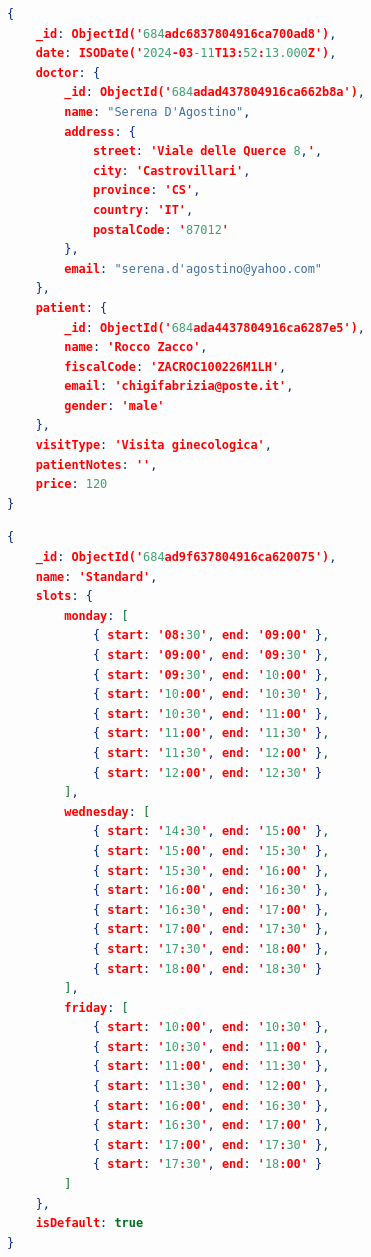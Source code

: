 \vspace{1em}

\begin{lstlisting}[language=json, caption={Example of an Appointment Document}]
{
    _id: ObjectId('684adc6837804916ca700ad8'),
    date: ISODate('2024-03-11T13:52:13.000Z'),
    doctor: {
        _id: ObjectId('684adad437804916ca662b8a'),
        name: "Serena D'Agostino",
        address: {
            street: 'Viale delle Querce 8,',
            city: 'Castrovillari',
            province: 'CS',
            country: 'IT',
            postalCode: '87012'
        },
        email: "serena.d'agostino@yahoo.com"
    },
    patient: {
        _id: ObjectId('684ada4437804916ca6287e5'),
        name: 'Rocco Zacco',
        fiscalCode: 'ZACROC100226M1LH',
        email: 'chigifabrizia@poste.it',
        gender: 'male'
    },
    visitType: 'Visita ginecologica',
    patientNotes: '',
    price: 120
}

\end{lstlisting}

\begin{lstlisting}[language=json, caption={Example of a Calendar Template Document}]
{
    _id: ObjectId('684ad9f637804916ca620075'),
    name: 'Standard',
    slots: {
        monday: [
            { start: '08:30', end: '09:00' },
            { start: '09:00', end: '09:30' },
            { start: '09:30', end: '10:00' },
            { start: '10:00', end: '10:30' },
            { start: '10:30', end: '11:00' },
            { start: '11:00', end: '11:30' },
            { start: '11:30', end: '12:00' },
            { start: '12:00', end: '12:30' }
        ],
        wednesday: [
            { start: '14:30', end: '15:00' },
            { start: '15:00', end: '15:30' },
            { start: '15:30', end: '16:00' },
            { start: '16:00', end: '16:30' },
            { start: '16:30', end: '17:00' },
            { start: '17:00', end: '17:30' },
            { start: '17:30', end: '18:00' },
            { start: '18:00', end: '18:30' }
        ],
        friday: [
            { start: '10:00', end: '10:30' },
            { start: '10:30', end: '11:00' },
            { start: '11:00', end: '11:30' },
            { start: '11:30', end: '12:00' },
            { start: '16:00', end: '16:30' },
            { start: '16:30', end: '17:00' },
            { start: '17:00', end: '17:30' },
            { start: '17:30', end: '18:00' }
        ]
    },
    isDefault: true
}
    
\end{lstlisting}

